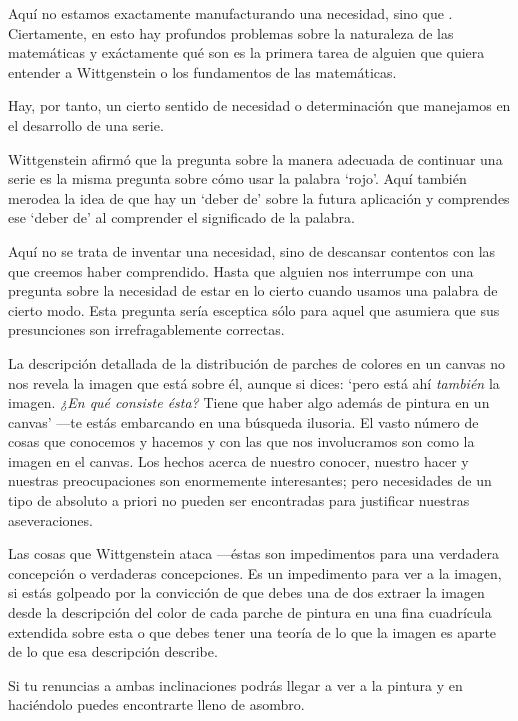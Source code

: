 Aquí no estamos exactamente manufacturando una necesidad, sino que
. 
Ciertamente, en esto hay profundos problemas sobre la naturaleza de las
matemáticas y exáctamente qué son es la primera tarea de alguien que quiera
entender a Wittgenstein o los fundamentos de las matemáticas.

Hay, por tanto, un cierto sentido de necesidad o determinación que manejamos en
el desarrollo de una serie.


Wittgenstein afirmó que la pregunta sobre la manera adecuada de continuar una
serie es la misma pregunta sobre cómo usar la palabra `rojo'. Aquí también
merodea la idea de que hay un `deber de' sobre la futura aplicación y comprendes
ese `deber de' al comprender el significado de la palabra.

Aquí no se trata de inventar una necesidad, sino de descansar contentos con las
que creemos haber comprendido. Hasta que alguien nos interrumpe con una pregunta
sobre la necesidad de estar en lo cierto cuando usamos una palabra de cierto
modo. Esta pregunta sería esceptica sólo para aquel que asumiera que sus
presunciones son irrefragablemente correctas.

La descripción detallada de la distribución de parches de colores en un canvas
no nos revela la imagen que está sobre él, aunque si dices: `pero está ahí
\emph{también} la imagen. \emph{¿En qué consiste ésta?} Tiene que haber algo
además de pintura en un canvas' ---te estás embarcando en una búsqueda ilusoria.
El vasto número de cosas que conocemos y hacemos y con las que nos involucramos
son como la imagen en el canvas. Los hechos acerca de nuestro conocer, nuestro
hacer y nuestras preocupaciones son enormemente interesantes; pero necesidades
de un tipo de absoluto a priori no pueden ser encontradas para justificar
nuestras aseveraciones.

Las cosas que Wittgenstein ataca ---éstas son impedimentos para una verdadera
concepción o verdaderas concepciones. Es un impedimento para ver a la imagen, si
estás golpeado por la convicción de que debes una de dos extraer la imagen desde
la descripción del color de cada parche de pintura en una fina cuadrícula
extendida sobre esta o que debes tener una teoría de lo que la imagen es aparte
de lo que esa descripción describe.

Si tu renuncias a ambas inclinaciones podrás llegar a ver a la pintura y en
haciéndolo puedes encontrarte lleno de asombro.

